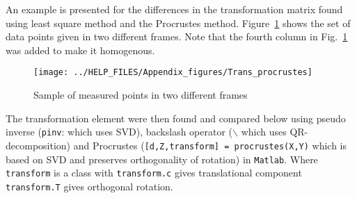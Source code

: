 \noindent An example is presented for the differences in the transformation matrix found using least square method and the Procrustes method. Figure~\ref{fig:Trans_procrustes} shows the set of data points given in two different frames. Note that the fourth column in Fig.~\ref{fig:Trans_procrustes} was added to make it homogenous.
\begin{figure}[t]
\centering
\texttt{[image: ../HELP\_FILES/Appendix\_figures/Trans\_procrustes]}
\caption{Sample of measured points in two different frames}
\label{fig:Trans_procrustes}
\end{figure}
The transformation element were then found and compared below using pseudo inverse (\texttt{pinv}: which uses SVD), backslash operator ($\backslash$ which uses QR-decomposition) and Procrustes (\texttt{[d,Z,transform] = procrustes(X,Y)} which is based on SVD and preserves orthogonality of rotation) in \texttt{Matlab}. Where \texttt{transform} is a class with \texttt{transform.c} gives translational component \texttt{transform.T} gives orthogonal rotation. 
